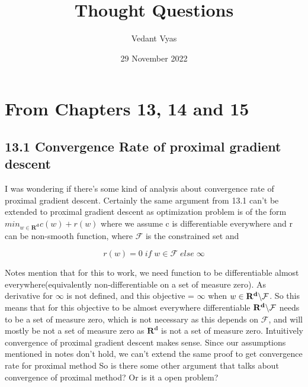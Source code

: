 \documentclass{article}
\title{Thought Questions}
\author{Vedant Vyas}
\date{29 November 2022}
\begin{document}
\maketitle

\section{From Chapters 13, 14 and 15}

\subsection{13.1 Convergence Rate of proximal gradient descent} 

I was wondering if there's some kind of analysis about convergence rate of proximal gradient descent. Certainly the same argument from 13.1 can't be extended to proximal gradient descent as optimization problem is of the form 
$min_{w \in \mathbf{R^{d}}} c(w) + r(w) $ where we assume c is differentiable everywhere and r can be non-smooth function, where  $\mathcal{F}$ is the constrained set and


\[r(w) = 0  \; if \; w \in \mathcal{F} \; else \; \infty \]

Notes mention that for this to work, we need function to be differentiable almost everywhere(equivalently non-differentiable on a set of measure zero). As derivative for $\infty$ is not defined, and this objective = $\infty$ when $w \in  \mathbf{R^{d}} \char`\\ \mathcal{F}$. So this means that for this objective to be almost everywhere differentiable $\mathbf{R^{d}} \char`\\ \mathcal{F}$ needs to be a set of measure zero, which is not necessary as this depends on $\mathcal{F}$, and will mostly be  not a set of measure zero as  $\mathbf{R^{d}}$ is not a set of measure zero. Intuitively convergence of proximal gradient descent makes sense. Since our assumptions mentioned in notes don't hold, we can't extend the same proof to get convergence rate for proximal method So is there some other argument that talks about convergence of proximal method? Or is it a open problem? 

\newpage
\end{document}
